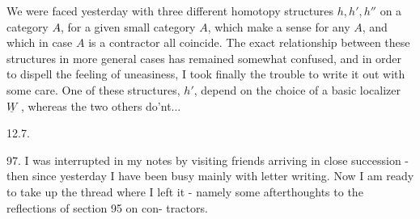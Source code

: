 
We were faced yesterday with three different homotopy structures
$h,h',h''$ on a category $A\hat{}$, for a given small category $A$, which make
a sense for any $A$, and which in case $A$ is a contractor all coincide.
The exact relationship between these structures in more general cases
has remained somewhat confused, and in order to dispell the 
feeling of uneasiness, I took finally the trouble  to write it out with
some care. One of these structures, $h'$, depend on the choice of a
basic localizer $\underline{W}$ , whereas the two others do'nt... 

12.7.

97. I was interrupted in my notes by visiting friends arriving in
close succession - then since yesterday I have been busy mainly with
letter writing. Now I am ready to take up the thread where I left it
- namely some afterthoughts to the reflections of section 95 on con-%
tractors.

